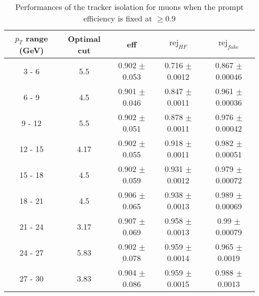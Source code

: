 \begin{table}[htbp]
   \centering
   \begin{tabular}{|c|c|c|c|c|}
      \hline
      $p_T$ range (GeV) & Optimal cut & eff & $\textrm{rej}_{HF}$ & $\textrm{rej}_{fake}$ \\
      \hline
      3 - 6 & 5.5 & 0.902 $\pm$ 0.053 & 0.716 $\pm$ 0.0012 & 0.867 $\pm$ 0.00046 \\
      \hline
      6 - 9 & 4.5 & 0.901 $\pm$ 0.046 & 0.847 $\pm$ 0.0011 & 0.961 $\pm$ 0.00036 \\
      \hline
      9 - 12 & 5.5 & 0.902 $\pm$ 0.051 & 0.878 $\pm$ 0.0011 & 0.976 $\pm$ 0.00042 \\
      \hline
      12 - 15 & 4.17 & 0.902 $\pm$ 0.055 & 0.918 $\pm$ 0.0011 & 0.982 $\pm$ 0.00051 \\
      \hline
      15 - 18 & 4.5 & 0.902 $\pm$ 0.059 & 0.931 $\pm$ 0.0012 & 0.979 $\pm$ 0.00072 \\
      \hline
      18 - 21 & 4.5 & 0.906 $\pm$ 0.065 & 0.938 $\pm$ 0.0013 & 0.989 $\pm$ 0.00069 \\
      \hline
      21 - 24 & 3.17 & 0.907 $\pm$ 0.069 & 0.958 $\pm$ 0.0013 & 0.99 $\pm$ 0.00079 \\
      \hline
      24 - 27 & 5.83 & 0.902 $\pm$ 0.078 & 0.959 $\pm$ 0.0014 & 0.965 $\pm$ 0.0019 \\
      \hline
      27 - 30 & 3.83 & 0.904 $\pm$ 0.086 & 0.959 $\pm$ 0.0015 & 0.988 $\pm$ 0.0013 \\
      \hline
   \end{tabular}
   \caption{\small{Performances of the tracker isolation for muons when the prompt efficiency is fixed at $\geq 0.9$}\label{tab:track_muon_eff}}
\end{table}